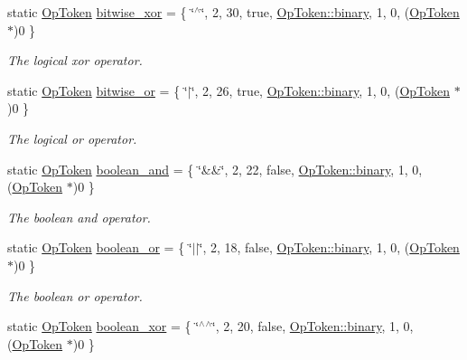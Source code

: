 \begin{DoxyCompactItemize}
static \mbox{\hyperlink{class_op_token}{Op\+Token}} \mbox{\hyperlink{class_print_c_a78decc2f4f0fdfb6ddc0dd505e4ddc71}{bitwise\+\_\+xor}} = \{ \char`\"{}$^\wedge$\char`\"{}, 2, 30, true, \mbox{\hyperlink{class_op_token_af41c7f108d5662ede7765c5a6c44eaffa3a2ec63522a9329a71ddbe8adc3e752d}{Op\+Token\+::binary}}, 1, 0, (\mbox{\hyperlink{class_op_token}{Op\+Token}} $\ast$)0 \}
\begin{DoxyCompactList}\small\item\em The {\itshape logical} {\itshape xor} operator. \end{DoxyCompactList}\item 
static \mbox{\hyperlink{class_op_token}{Op\+Token}} \mbox{\hyperlink{class_print_c_ae8c841b464ec7c570db628387d17ba23}{bitwise\+\_\+or}} = \{ \char`\"{}$\vert$\char`\"{}, 2, 26, true, \mbox{\hyperlink{class_op_token_af41c7f108d5662ede7765c5a6c44eaffa3a2ec63522a9329a71ddbe8adc3e752d}{Op\+Token\+::binary}}, 1, 0, (\mbox{\hyperlink{class_op_token}{Op\+Token}} $\ast$)0 \}
\begin{DoxyCompactList}\small\item\em The {\itshape logical} {\itshape or} operator. \end{DoxyCompactList}\item 
static \mbox{\hyperlink{class_op_token}{Op\+Token}} \mbox{\hyperlink{class_print_c_a1d27aadfb5e25d1f65cc9af856dd0566}{boolean\+\_\+and}} = \{ \char`\"{}\&\&\char`\"{}, 2, 22, false, \mbox{\hyperlink{class_op_token_af41c7f108d5662ede7765c5a6c44eaffa3a2ec63522a9329a71ddbe8adc3e752d}{Op\+Token\+::binary}}, 1, 0, (\mbox{\hyperlink{class_op_token}{Op\+Token}} $\ast$)0 \}
\begin{DoxyCompactList}\small\item\em The {\itshape boolean} {\itshape and} operator. \end{DoxyCompactList}\item 
static \mbox{\hyperlink{class_op_token}{Op\+Token}} \mbox{\hyperlink{class_print_c_ae664fd2b1cbfba34687c8b51a984ffec}{boolean\+\_\+or}} = \{ \char`\"{}$\vert$$\vert$\char`\"{}, 2, 18, false, \mbox{\hyperlink{class_op_token_af41c7f108d5662ede7765c5a6c44eaffa3a2ec63522a9329a71ddbe8adc3e752d}{Op\+Token\+::binary}}, 1, 0, (\mbox{\hyperlink{class_op_token}{Op\+Token}} $\ast$)0 \}
\begin{DoxyCompactList}\small\item\em The {\itshape boolean} {\itshape or} operator. \end{DoxyCompactList}\item 
static \mbox{\hyperlink{class_op_token}{Op\+Token}} \mbox{\hyperlink{class_print_c_a7793af3839014ca8952d53f153ebe65a}{boolean\+\_\+xor}} = \{ \char`\"{}$^\wedge$$^\wedge$\char`\"{}, 2, 20, false, \mbox{\hyperlink{class_op_token_af41c7f108d5662ede7765c5a6c44eaffa3a2ec63522a9329a71ddbe8adc3e752d}{Op\+Token\+::binary}}, 1, 0, (\mbox{\hyperlink{class_op_token}{Op\+Token}} $\ast$)0 \}

\end{DoxyCompactItemize}
